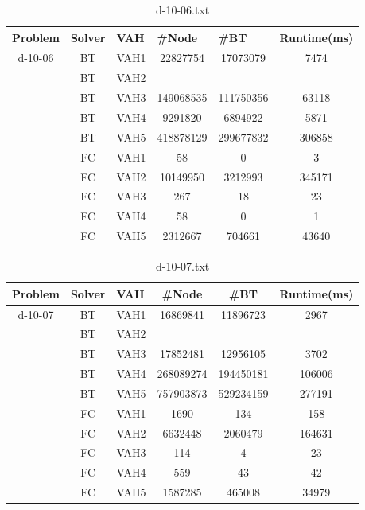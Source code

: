 \documentclass{article}
\begin{document}
\begin{table}[]
\caption{d-10-06.txt}
\begin{tabular}{|c|c|c|c|c|c|}
\hline
Problem                   & Solver & \multicolumn{1}{l|}{VAH} & \multicolumn{1}{l|}{\#Node} & \multicolumn{1}{l|}{\#BT} & \multicolumn{1}{l|}{Runtime(ms)} \\ \hline
\multirow{10}{*}{d-10-06} & BT     & VAH1                     & 22827754                    & 17073079                  & 7474                             \\ \cline{2-6} 
 & BT & VAH2 &           &           &        \\ \cline{2-6} 
 & BT & VAH3 & 149068535 & 111750356 & 63118  \\ \cline{2-6} 
 & BT & VAH4 & 9291820   & 6894922   & 5871   \\ \cline{2-6} 
 & BT & VAH5 & 418878129 & 299677832 & 306858 \\ \cline{2-6} 
 & FC & VAH1 & 58        & 0         & 3      \\ \cline{2-6} 
 & FC & VAH2 & 10149950  & 3212993   & 345171  \\ \cline{2-6} 
 & FC & VAH3 & 267       & 18        & 23     \\ \cline{2-6} 
 & FC & VAH4 & 58        & 0         & 1      \\ \cline{2-6} 
 & FC & VAH5 & 2312667   & 704661    & 43640  \\ \hline
\end{tabular}
\end{table}

\begin{table}[]
\caption{d-10-07.txt}
\label{tab:my-table}
\begin{tabular}{|c|c|c|c|c|c|}
\hline
Problem & Solver & \multicolumn{1}{l|}{VAH} & \#Node & \#BT & \multicolumn{1}{l|}{Runtime(ms)} \\ \hline
\multirow{10}{*}{d-10-07} & BT & VAH1 & 16869841 & 11896723 & 2967 \\ \cline{2-6} 
 & BT & VAH2 &  &  &  \\ \cline{2-6} 
 & BT & VAH3 & 17852481 & 12956105 & 3702 \\ \cline{2-6} 
 & BT & VAH4 & 268089274 & 194450181 & 106006 \\ \cline{2-6} 
 & BT & VAH5 & 757903873 & 529234159 & 277191 \\ \cline{2-6} 
 & FC & VAH1 & 1690 & 134 & 158 \\ \cline{2-6} 
 & FC & VAH2 & 6632448 & 2060479 & 164631 \\ \cline{2-6} 
 & FC & VAH3 & 114 & 4 & 23 \\ \cline{2-6} 
 & FC & VAH4 & 559 & 43 & 42 \\ \cline{2-6} 
 & FC & VAH5 & 1587285 & 465008 & 34979 \\ \hline
\end{tabular}
\end{table}
\end{document}
